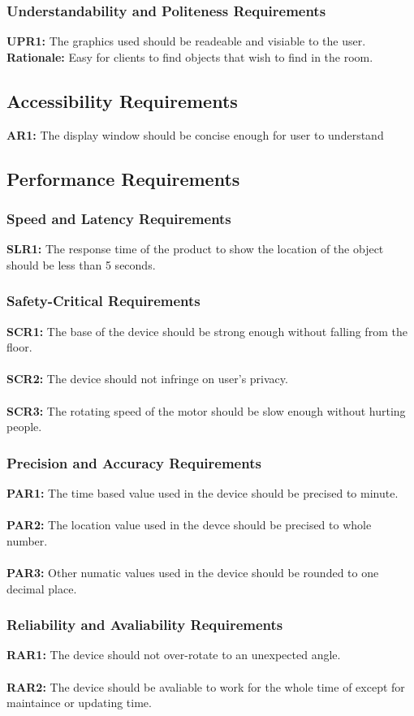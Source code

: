 \documentclass[12pt]{article}
\begin{document}
\subsubsection{Understandability and Politeness Requirements}
\textbf{UPR1:} The graphics used should be readeable and visiable to the user.\\
\textbf{Rationale:} Easy for clients to find objects that wish to find in the room.
\subsection{Accessibility Requirements}
\textbf{AR1:} The display window should be concise enough for user to understand
\subsection{Performance Requirements}
\subsubsection{Speed and Latency Requirements}
\textbf{SLR1:} The response time of the product to show the location of the object should be less than 5 seconds.
\subsubsection{Safety-Critical Requirements}
\textbf{SCR1:} The base of the device should be strong enough without falling from the floor.\\\\
\textbf{SCR2:} The device should not infringe on user's privacy.\\\\
\textbf{SCR3:} The rotating speed of the motor should be slow enough without hurting people.
\subsubsection{Precision and Accuracy Requirements}
\textbf{PAR1:} The time based value used in the device should be precised to minute.\\\\
\textbf{PAR2:} The location value used in the devce should be precised to whole number.\\\\
\textbf{PAR3:} Other numatic values used in the device should be rounded to one decimal place.
\subsubsection{Reliability and Avaliability Requirements}
\textbf{RAR1:} The device should not over-rotate to an unexpected angle.\\\\
\textbf{RAR2:} The device should be avaliable to work for the whole time of except for maintaince or updating time.
\end{document}
